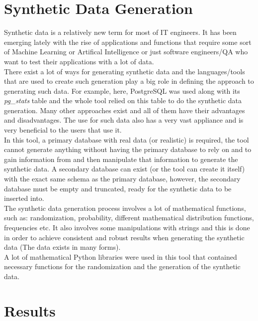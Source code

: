 \section{Synthetic Data Generation}
Synthetic data is a relatively new term for most of IT engineers. It has been emerging lately with the rise of applications and functions that require some sort of Machine Learning or Artifical Intelligence or just software engineers/QA who want to test their applications with a lot of data.\\
\newline
There exist a lot of ways for generating synthetic data and the languages/tools that are used to create such generation play a big role in defining the approach to generating such data. For example, here, PostgreSQL was used along with its \textit{pg\_stats} table and the whole tool relied on this table to do the synthetic data generation. Many other approaches exist and all of them have their advantages and disadvantages. The use for such data also has a very vast appliance and is very beneficial to the users that use it.\\
\newline
In this tool, a primary database with real data (or realistic) is required, the tool cannot generate anything without having the primary database to rely on and to gain information from and then manipulate that information to generate the synthetic data. A secondary database can exist (or the tool can create it itself) with the exact same schema as the primary database, however, the secondary database must be empty and truncated, ready for the synthetic data to be inserted into.\\
\newline
The synthetic data generation process involves a lot of mathematical functions, such as: randomization, probability, different mathematical distribution functions, frequencies etc. It also involves some manipulations with strings and this is done in order to achieve consistent and robust results when generating the synthetic data (The data exists in many forms).\\
A lot of mathematical Python libraries were used in this tool that contained necessary functions for the randomization and the generation of the synthetic data.
\newpage
\section{Results}
\lipsum[5-6]